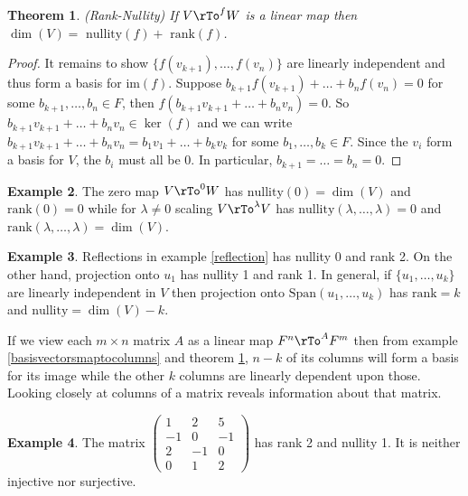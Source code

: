 \documentclass[12pt]{amsart}
\newtheorem{theorem}{Theorem}[section]
\theoremstyle{definition}
\newtheorem{example}[theorem]{Example}
\begin{document}
\begin{theorem}\label{ranknullity} (Rank-Nullity) If $V \rTo^f W$ is a linear map then $\dim(V) = \text{ nullity}(f) + \text{ rank}(f)$.
\end{theorem}
\begin{proof} It remains to show $\{f(v_{k+1}), \dots, f(v_n)\}$ are linearly independent and thus form a basis for $\text{im}(f)$. Suppose $b_{k+1}f(v_{k+1}) + \ldots + b_nf(v_n) = 0$ for some $b_{k+1}, \dots, b_n \in F$, then $f(b_{k+1}v_{k+1} + \ldots + b_nv_n) = 0$. So $b_{k+1}v_{k+1} + \ldots + b_nv_n \in \ker(f)$ and we can write $b_{k+1}v_{k+1} + \ldots + b_nv_n = b_1v_1 + \ldots + b_kv_k$ for some $b_1, \dots, b_k \in F$. Since the $v_i$ form a basis for $V$, the $b_i$ must all be 0. In particular, $b_{k+1} = \dots = b_n = 0$.
\end{proof}

\begin{example} The zero map $V \rTo^0 W$ has $\text{nullity}(0) = \dim(V)$ and $\text{rank}(0) = 0$ while for $\lambda \neq 0$ scaling $V \rTo^{\lambda} V$ has $\text{nullity}(\lambda, \dots , \lambda) = 0$ and $\text{rank}(\lambda, \dots , \lambda) = \dim(V)$.
\end{example}

\begin{example} Reflections in example \ref{reflection} has nullity 0 and rank 2. On the other hand, projection onto $u_1$ has nullity 1 and rank 1. In general, if $\{u_1, \dots, u_k\}$ are linearly independent in $V$ then projection onto $\text{Span}(u_1, \dots, u_k)$ has $\text{rank} = k$ and $\text{nullity} = \dim(V) - k$.
\end{example}

If we view each $m \times n$ matrix $A$ as a linear map $F^n \rTo^{A} F^m$ then from example \ref{basisvectorsmaptocolumns} and theorem \ref{ranknullity}, $n-k$ of its columns will form a basis for its image while the other $k$ columns are linearly dependent upon those. Looking closely at columns of a matrix reveals information about that matrix.

\begin{example}\label{} The matrix $\left(\begin{array}{ccc} 1 & 2 & 5 \\ -1 & 0 & -1\\ 2 & -1 & 0 \\ 0 & 1 & 2 \end{array}\right)$ has rank 2 and nullity 1. It is neither injective nor surjective.
\end{example}
\end{document}

